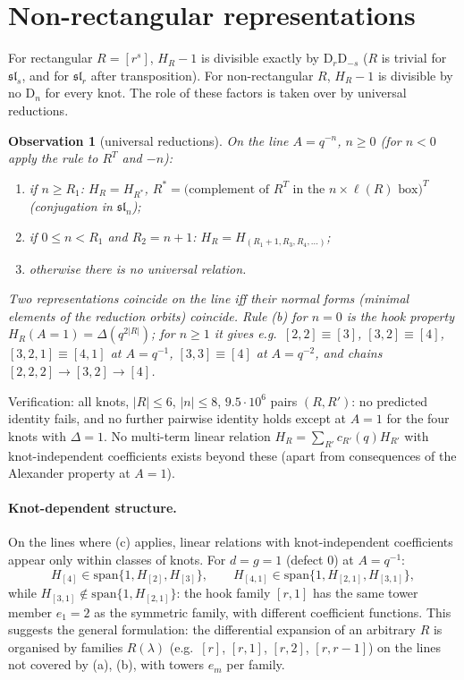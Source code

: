 \documentclass[11pt]{article}
\newtheorem{observation}{Observation}
\theoremstyle{definition}
\theoremstyle{remark}
\newcommand{\D}{\mathrm{D}}
\begin{document}
\section{Non-rectangular representations}\label{sec:nonrect}

For rectangular $R=[r^s]$, $H_R-1$ is divisible exactly by $\D_r\D_{-s}$
($R$ is trivial for $\mathfrak{sl}_s$, and for $\mathfrak{sl}_r$ after transposition).
For non-rectangular $R$, $H_R-1$ is divisible by no $\D_n$ for every knot.
The role of these factors is taken over by universal reductions.

\begin{observation}[universal reductions]\label{obs:red}
On the line $A=q^{-n}$, $n\ge0$ (for $n<0$ apply the rule to $R^T$ and $-n$):
\begin{enumerate}
\item[(a)] if $n\ge R_1$: $H_R=H_{R^*}$, $R^*=\big(\text{complement of }R^T\text{ in the }n\times\ell(R)
\text{ box}\big)^T$ (conjugation in $\mathfrak{sl}_n$);
\item[(b)] if $0\le n<R_1$ and $R_2=n+1$: $H_R=H_{(R_1+1,R_3,R_4,\dots)}$;
\item[(c)] otherwise there is no universal relation.
\end{enumerate}
Two representations coincide on the line iff their normal forms (minimal elements of the reduction
orbits) coincide.  Rule (b) for $n=0$ is the hook property $H_R(A=1)=\Delta(q^{2|R|})$; for $n\ge1$ it
gives e.g.\ $[2,2]\equiv[3]$, $[3,2]\equiv[4]$, $[3,2,1]\equiv[4,1]$ at $A=q^{-1}$,
$[3,3]\equiv[4]$ at $A=q^{-2}$, and chains $[2,2,2]\to[3,2]\to[4]$.
\end{observation}
Verification: all knots, $|R|\le6$, $|n|\le8$, $9.5\cdot10^6$ pairs $(R,R')$: no predicted identity fails,
and no further pairwise identity holds except at $A=1$ for the four knots with $\Delta=1$.
No multi-term linear relation $H_R=\sum_{R'}c_{R'}(q)H_{R'}$ with knot-independent coefficients exists
beyond these (apart from consequences of the Alexander property at $A=1$).

\paragraph{Knot-dependent structure.}
On the lines where (c) applies, linear relations with knot-independent coefficients appear only within
classes of knots.  For $d=g=1$ (defect 0) at $A=q^{-1}$:
\[
  H_{[4]}\in\mathrm{span}\{1,H_{[2]},H_{[3]}\},\qquad
  H_{[4,1]}\in\mathrm{span}\{1,H_{[2,1]},H_{[3,1]}\},
\]
while $H_{[3,1]}\notin\mathrm{span}\{1,H_{[2,1]}\}$: the hook family $[r,1]$ has the same tower member
$e_1=2$ as the symmetric family, with different coefficient functions.  This suggests the general
formulation: the differential expansion of an arbitrary $R$ is organised by families $R(\lambda)$
(e.g.\ $[r]$, $[r,1]$, $[r,2]$, $[r,r-1]$) on the lines not covered by (a), (b), with towers $e_m$ per
family.
\end{document}
